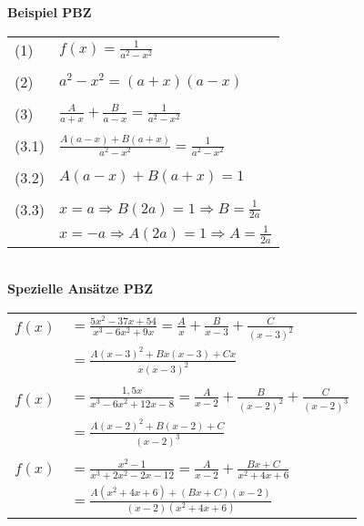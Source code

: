     \textbf{Beispiel PBZ} \\
        \begin{tabular}{ll}
            (1) & $f(x) = \frac{1}{a^2 - x^2}$ \\
            \\
            (2) & $a^2 - x^2 = (a+x)(a-x)$ \\
            \\
            (3) & $\frac{A}{a+x} + \frac{B}{a-x} = \frac{1}{a^2 - x^2}$\\
            \\
            (3.1) & $\frac{A(a-x) + B(a+x)}{a^2 - x^2} = \frac{1}{a^2 - x^2}$ \\
            \\
            (3.2) &$ A(a-x) + B(a+x) = 1$ \\
            \\
            (3.3) & $x = a \Rightarrow B(2a) = 1 \Rightarrow B = \frac{1}{2a} $ \\			
            & $x = -a \Rightarrow A(2a) = 1 \Rightarrow A = \frac{1}{2a} $ \\
        \end{tabular}
    \\
    \textbf{Spezielle Ansätze PBZ} \\
        \begin{tabular}{ll}
            $f(x)$ & $=\frac{5x^2-37x+54}{x^3-6x^2+9x} =  \frac{A}{x}+\frac{B}{x-3}+\frac{C}{(x-3)^2}$ \\ 
                   & $=\frac{A(x-3)^2+Bx(x-3)+Cx}{x(x-3)^2}$ \\
            \\
            $f(x)$ & $=\frac{1,5x}{x^3-6x^2+12x-8}=\frac{A}{x-2}+\frac{B}{(x-2)^2}+\frac{C}{(x-2)^3}$ \\
                   & $=\frac{A(x-2)^2+B(x-2)+C}{(x-2)^3}$ \\
            \\
            $f(x)$ & $=\frac{x^2-1}{x^3+2x^2-2x-12}=\frac{A}{x-2}+\frac{Bx+C}{x^2+4x+6}$ \\
                   & $=\frac{A(x^2+4x+6)+(Bx+C)(x-2)}{(x-2)(x^2+4x+6)}$ \\
        \end{tabular}

